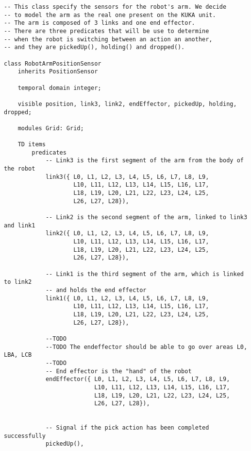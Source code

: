 \begin{lstlisting}[fontadjust, mathescape, frame=single] 
-- This class specify the sensors for the robot's arm. We decide
-- to model the arm as the real one present on the KUKA unit.
-- The arm is composed of 3 links and one end effector.
-- There are three predicates that will be use to determine
-- when the robot is switching between an action an another,
-- and they are pickedUp(), holding() and dropped().

class RobotArmPositionSensor
    inherits PositionSensor

    temporal domain integer;

    visible position, link3, link2, endEffector, pickedUp, holding, dropped;

    modules Grid: Grid;

    TD items
        predicates
            -- Link3 is the first segment of the arm from the body of the robot
            link3({ L0, L1, L2, L3, L4, L5, L6, L7, L8, L9,
                    L10, L11, L12, L13, L14, L15, L16, L17,
                    L18, L19, L20, L21, L22, L23, L24, L25,
                    L26, L27, L28}),
                    
            -- Link2 is the second segment of the arm, linked to link3 and link1
            link2({ L0, L1, L2, L3, L4, L5, L6, L7, L8, L9,
                    L10, L11, L12, L13, L14, L15, L16, L17,
                    L18, L19, L20, L21, L22, L23, L24, L25,
                    L26, L27, L28}),
                    
            -- Link1 is the third segment of the arm, which is linked to link2 
            -- and holds the end effector
            link1({ L0, L1, L2, L3, L4, L5, L6, L7, L8, L9,
                    L10, L11, L12, L13, L14, L15, L16, L17,
                    L18, L19, L20, L21, L22, L23, L24, L25,
                    L26, L27, L28}),
                    
            --TODO
            --TODO The endeffector should be able to go over areas L0, LBA, LCB
            --TODO         
            -- End effector is the "hand" of the robot
            endEffector({ L0, L1, L2, L3, L4, L5, L6, L7, L8, L9,
                          L10, L11, L12, L13, L14, L15, L16, L17,
                          L18, L19, L20, L21, L22, L23, L24, L25,
                          L26, L27, L28}),
                    

            -- Signal if the pick action has been completed successfully
            pickedUp(),


\end{lstlisting}
